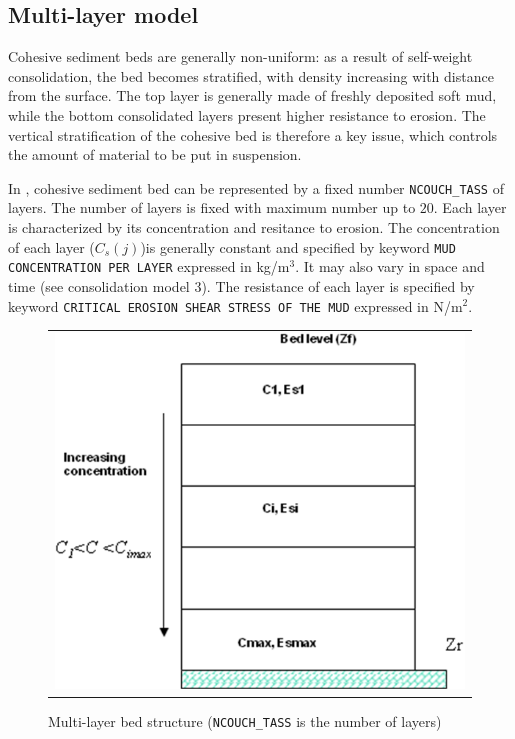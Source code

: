 \subsection{Multi-layer model}


Cohesive sediment beds are generally non-uniform: as a result of
self-weight consolidation, the bed becomes stratified, with density
increasing with distance from the surface. The top layer is generally made
of freshly deposited soft mud, while the bottom consolidated layers present
higher resistance to erosion. The vertical
stratification of the cohesive bed is therefore a key issue, which controls the
amount of material to be put in suspension. 

In \sisyphe, cohesive sediment bed can be represented by a fixed number
\texttt{NCOUCH\_TASS} of layers. The number of
layers is fixed with maximum number up to $20$. Each layer is characterized by its 
concentration and resitance to erosion. The concentration of each layer ($C_s (j)$)is generally constant
and specified by keyword \texttt{MUD CONCENTRATION PER LAYER} expressed in kg/m$^3$. It
may also vary in space and time (see consolidation model 3).
The resistance of each layer is specified by keyword \texttt{CRITICAL EROSION SHEAR STRESS OF THE MUD} expressed in N/m$^2$.

\begin{figure}[ht]
\label{fig:1}
\begin{center}
\begin{tabular}{c}
\includegraphics[scale=1.0]{graphics/vertical_bed_structure.png} %
\end{tabular}
\caption{Multi-layer bed structure (\texttt{NCOUCH\_TASS} is the number of layers)}
\end{center}
\end{figure}


